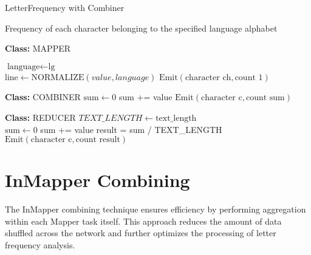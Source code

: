 \begin{algorithm}
    \caption{LetterFrequency with Combiner}
    \begin{algorithmic}[1]
    \Ensure Frequency of each character belonging to the specified language alphabet
    \\
    \Statex
    
    \textbf{Class:} MAPPER

        \State $\text{language} \gets \text{lg}$ 
    \EndProcedure\\

            \State $\text{line} \gets \text{NORMALIZE}(value, language)$ 
            \State $\text{Emit}(\text{character ch}, \text{count 1})$    
        \EndFor
    \EndProcedure\\

    
    \Statex
    
    \textbf{Class:} COMBINER
                \State $\text{sum} \gets 0$
         
            \State sum += value
        \EndFor
        \State $\text{Emit}(\text{character c}, \text{count sum})$
    \EndProcedure\\
    
    \Statex
    
    \textbf{Class:} REDUCER
        \State $\text{$TEXT\_LENGTH$} \gets \text{text\_length}$ 
    \EndProcedure\\

        \State $\text{sum} \gets 0$
         
            \State sum += value
        \EndFor
        \State result = sum / TEXT\_LENGTH 
        \State $\text{Emit}(\text{character c}, \text{count result})$
    \EndProcedure
    
    \end{algorithmic}
    \end{algorithm}


\newpage



\section{InMapper Combining}
The InMapper combining technique ensures efficiency by performing aggregation within each Mapper task itself. This approach reduces the amount of data shuffled across the network and further optimizes the processing of letter frequency analysis.


